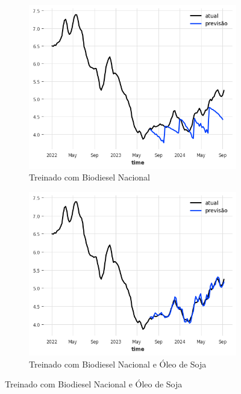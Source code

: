 \begin{figure}[htbp]
	\centering
	\begin{subfigure}[b]{0.45\textwidth}
		\centering
		\includegraphics[width=\textwidth]{figuras/narx_takens_brasil_plot.png} %
		\caption{Treinado com Biodiesel Nacional \newline}
		\label{fig:narx_takens_brasil_plot}
	\end{subfigure}
	\hfill
	\begin{subfigure}[b]{0.45\textwidth}
		\centering
		\includegraphics[width=\textwidth]{figuras/narx_takens_brasil_oil_plot.png} %
		\caption{Treinado com Biodiesel Nacional e Óleo de Soja}
		\label{fig:narx_takens_brasil_oil_plot}
	\end{subfigure}


\end{figure}
